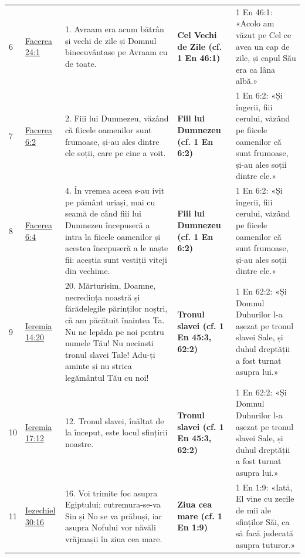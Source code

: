 \documentclass[12pt,a4paper,twoside,openany]{book}
\begin{document}
\begin{longtable}{L{0.8cm}L{0.8cm}L{8.4cm}L{0.9cm}L{3.6cm}}
6 & \href{https://bibliaortodoxa.ro/carte.php?id=25\&cap=24\#1}{Facerea 24:1} & 1. Avraam era acum bătrân și vechi de zile și Domnul binecuvântase pe Avraam cu de toate. & \textbf{Cel Vechi de Zile (cf. 1 En 46:1)} & 1 En 46:1: «Acolo am văzut pe Cel ce avea un cap de zile, și capul Său era ca lâna albă.» \\
7 & \href{https://bibliaortodoxa.ro/carte.php?id=25\&cap=6\#2}{Facerea 6:2} & 2. Fiii lui Dumnezeu, văzând că fiicele oamenilor sunt frumoase, și-au ales dintre ele soții, care pe cine a voit. & \textbf{Fiii lui Dumnezeu (cf. 1 En 6:2)} & 1 En 6:2: «Și îngerii, fiii cerului, văzând pe fiicele oamenilor că sunt frumoase, și-au ales soții dintre ele.» \\
8 & \href{https://bibliaortodoxa.ro/carte.php?id=25\&cap=6\#4}{Facerea 6:4} & 4. În vremea aceea s-au ivit pe pământ uriași, mai cu seamă de când fiii lui Dumnezeu începuseră a intra la fiicele oamenilor și acestea începuseră a le naște fii: aceștia sunt vestiții viteji din vechime. & \textbf{Fiii lui Dumnezeu (cf. 1 En 6:2)} & 1 En 6:2: «Și îngerii, fiii cerului, văzând pe fiicele oamenilor că sunt frumoase, și-au ales soții dintre ele.» \\
9 & \href{https://bibliaortodoxa.ro/carte.php?id=31\&cap=14\#20}{Ieremia 14:20} & 20. Mărturisim, Doamne, necredința noastră și fărădelegile părinților noștri, că am păcătuit înaintea Ta. Nu ne lepăda pe noi pentru numele Tău! Nu necinsti tronul slavei Tale! Adu-ți aminte și nu strica legământul Tău cu noi! & \textbf{Tronul slavei (cf. 1 En 45:3, 62:2)} & 1 En 62:2: «Și Domnul Duhurilor l-a așezat pe tronul slavei Sale, și duhul dreptății a fost turnat asupra lui.» \\
10 & \href{https://bibliaortodoxa.ro/carte.php?id=31\&cap=17\#12}{Ieremia 17:12} & 12. Tronul slavei, înălțat de la început, este locul sfințirii noastre. & \textbf{Tronul slavei (cf. 1 En 45:3, 62:2)} & 1 En 62:2: «Și Domnul Duhurilor l-a așezat pe tronul slavei Sale, și duhul dreptății a fost turnat asupra lui.» \\
11 & \href{https://bibliaortodoxa.ro/carte.php?id=33\&cap=30\#16}{Iezechiel 30:16} & 16. Voi trimite foc asupra Egiptului; cutremura-se-va Sin și No se va prăbuși, iar asupra Nofului vor năvăli vrăjmașii în ziua cea mare. & \textbf{Ziua cea mare (cf. 1 En 1:9)} & 1 En 1:9: «Iată, El vine cu zecile de mii ale sfinților Săi, ca să facă judecată asupra tuturor.» \\

\end{longtable}
\end{document}
